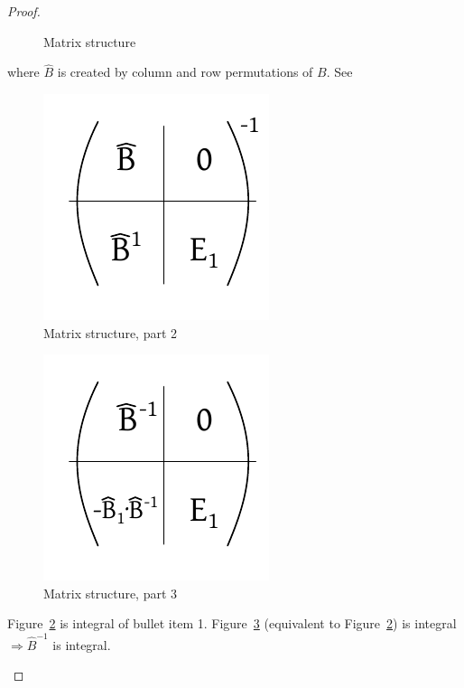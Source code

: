\documentclass[a4paper]{article}
\theoremstyle{definition}
\begin{document}
\begin{proof}
\begin{itemize}
\begin{itemize}
\begin{figure}[!ht]
\begin{center}
              \caption{Matrix structure}
              \label{fig:matstr}
            \end{center}
          \end{figure}
          where $\hat B$ is created by column and row permutations of $B$. See
          \begin{figure}[!ht]
            \begin{center}
              \includegraphics{img/matrix_structure_2.pdf}
              \caption{Matrix structure, part 2}
              \label{fig:matstr2}
            \end{center}
          \end{figure}
          \begin{figure}[!ht]
            \begin{center}
              \includegraphics{img/matrix_structure_3.pdf}
              \caption{Matrix structure, part 3}
              \label{fig:matstr3}
            \end{center}
          \end{figure}
          Figure~\ref{fig:matstr2} is integral of bullet item 1.
          Figure~\ref{fig:matstr3} (equivalent to Figure~\ref{fig:matstr2}) is integral $\Rightarrow \hat{B}^{-1}$ is integral.


\end{itemize}
\end{itemize}
\end{proof}
\end{document}
